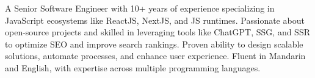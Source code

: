 

\begin{cvparagraph}

  A Senior Software Engineer with 10+ years of experience specializing in JavaScript ecosystems like ReactJS, NextJS, and JS runtimes. Passionate about open-source projects and skilled in leveraging tools like ChatGPT, SSG, and SSR to optimize SEO and improve search rankings. Proven ability to design scalable solutions, automate processes, and enhance user experience. Fluent in Mandarin and English, with expertise across multiple programming languages.
\end{cvparagraph}
